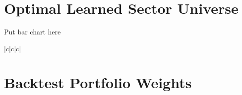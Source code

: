 \documentclass[../main.tex]{subfiles}
\begin{document}
\twocolumn

\chapter{Optimal Learned Sector Universe} \label{appendix:optimal_ls}

Put bar chart here

%

\clearpage


\begin{center}
    \tabletail{\midrule}
    \tablelasttail{\bottomrule}
    \begin{supertabular}{|c|c|c|}
    \end{supertabular}
\end{center}



\onecolumn

\chapter{Backtest Portfolio Weights} \label{appendix:portfolio_weights}
\end{document}
